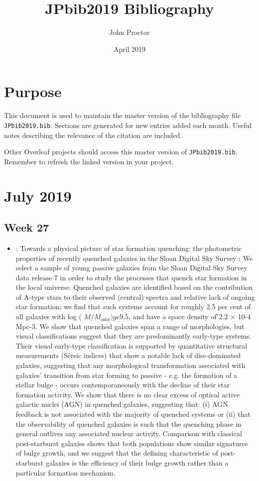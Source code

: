 \documentclass[ceqn,usenatbib,onecolumn]{mnras}
\title{JPbib2019 Bibliography}
\author{John Proctor}
\date{April 2019}
\begin{document}
\maketitle

\section{Purpose}
This document is used to maintain the master version of the bibliography file \texttt{JPbib2019.bib}. Sections are generated for new entries added each month. Useful notes describing the relevance of the citation are included.
\par Other Overleaf projects should access this master version of \texttt{JPbib2019.bib}. Remember to refresh the linked version in your project.


\section{July 2019}
\subsection{Week 27}

\begin{itemize}
    \item \citet{2013MNRAS.429.2212M} : {Towards a physical picture of star formation quenching: the photometric properties of recently quenched galaxies in the Sloan Digital Sky Survey} : We select a sample of young passive galaxies from the Sloan Digital Sky Survey data release 7 in order to study the processes that quench star formation in the local universe. Quenched galaxies are identified based on the contribution of A-type stars to their observed (central) spectra and relative lack of ongoing star formation; we find that such systems account for roughly 2.5 per cent of all galaxies with log ( $M/M_{odot }) ge 9.5$, and have a space density of ̃2.2 × 10-4 Mpc-3. We show that quenched galaxies span a range of morphologies, but visual classifications suggest that they are predominantly early-type systems. Their visual early-type classification is supported by quantitative structural measurements (Sérsic indices) that show a notable lack of disc-dominated galaxies, suggesting that any morphological transformation associated with galaxies' transition from star forming to passive - e.g. the formation of a stellar bulge - occurs contemporaneously with the decline of their star formation activity. We show that there is no clear excess of optical active galactic nuclei (AGN) in quenched galaxies, suggesting that: (i) AGN feedback is not associated with the majority of quenched systems or (ii) that the observability of quenched galaxies is such that the quenching phase in general outlives any associated nuclear activity. Comparison with classical post-starburst galaxies shows that both populations show similar signatures of bulge growth, and we suggest that the defining characteristic of post-starburst galaxies is the efficiency of their bulge growth rather than a particular formation mechanism.
\end{itemize}
\end{document}
